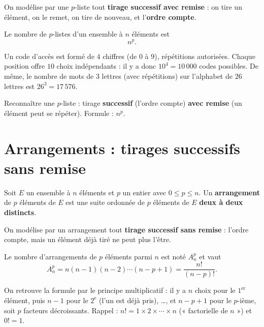 On modélise par une $p$-liste tout \textbf{tirage successif avec remise} : on tire un
élément, on le remet, on tire de nouveau, et l'\textbf{ordre compte}.

\begin{theoreme}
Le nombre de $p$-listes d'un ensemble à $n$ éléments est
\[ n^p. \]
\end{theoreme}

\begin{exemple}
Un code d'accès est formé de $4$ chiffres (de $0$ à $9$), répétitions autorisées.
Chaque position offre $10$ choix indépendants : il y a donc $10^4=10\,000$ codes
possibles. De même, le nombre de mots de $3$ lettres (avec répétitions) sur l'alphabet
de $26$ lettres est $26^3=17\,576$.
\end{exemple}

\begin{aretenir}
Reconnaître une $p$-liste : tirage \textbf{successif} (l'ordre compte) \textbf{avec
remise} (un élément peut se répéter). Formule : $n^p$.
\end{aretenir}

\section{Arrangements : tirages successifs sans remise}

\begin{definition}[Arrangement]
Soit $E$ un ensemble à $n$ éléments et $p$ un entier avec $0\le p\le n$. Un
\textbf{arrangement} de $p$ éléments de $E$ est une suite ordonnée de $p$ éléments de
$E$ \textbf{deux à deux distincts}.
\end{definition}

On modélise par un arrangement tout \textbf{tirage successif sans remise} : l'ordre
compte, mais un élément déjà tiré ne peut plus l'être.

\begin{theoreme}
Le nombre d'arrangements de $p$ éléments parmi $n$ est noté $A_n^p$ et vaut
\[ A_n^p=n(n-1)(n-2)\cdots(n-p+1)=\frac{n!}{(n-p)!}. \]
\end{theoreme}

\begin{remarque}
On retrouve la formule par le principe multiplicatif : il y a $n$ choix pour le
$1^{\text{er}}$ élément, puis $n-1$ pour le $2^{\text{e}}$ (l'un est déjà pris),
\dots, et $n-p+1$ pour le $p$-ième, soit $p$ facteurs décroissants. Rappel :
$n!=1\times 2\times\cdots\times n$ (« factorielle de $n$ ») et $0!=1$.
\end{remarque}

